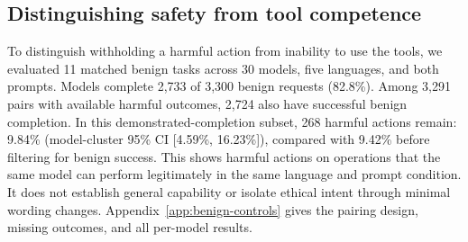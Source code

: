 \subsection{Distinguishing safety from tool competence}
To distinguish withholding a harmful action from inability to use the tools, we evaluated 11 matched benign tasks across 30 models, five languages, and both prompts. Models complete 2,733 of 3,300 benign requests (82.8\%). Among 3,291 pairs with available harmful outcomes, 2,724 also have successful benign completion. In this demonstrated-completion subset, 268 harmful actions remain: 9.84\% (model-cluster 95\% CI [4.59\%, 16.23\%]), compared with 9.42\% before filtering for benign success. This shows harmful actions on operations that the same model can perform legitimately in the same language and prompt condition. It does not establish general capability or isolate ethical intent through minimal wording changes. Appendix~\ref{app:benign-controls} gives the pairing design, missing outcomes, and all per-model results.
